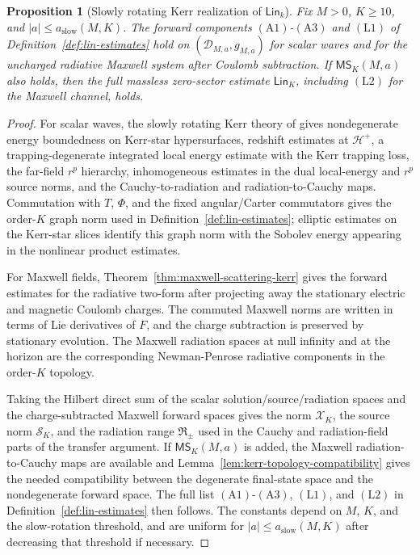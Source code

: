 \documentclass[11pt]{article}
\numberwithin{equation}{section}
\theoremstyle{plain}
\newtheorem{proposition}[theorem]{Proposition}
\theoremstyle{definition}
\theoremstyle{remark}
\newcommand{\Lin}{\mathsf{Lin}}
\newcommand{\MScat}{\mathsf{MS}}
\begin{document}
\begin{proposition}[Slowly rotating Kerr realization of \(\Lin_k\)]\label{prop:lin-estimates-kerr}
Fix \(M>0\), \(K\ge10\), and \(|a|\le a_{\mathrm{slow}}(M,K)\).  The forward components \(\mathrm{(A1)}\)-\(\mathrm{(A3)}\) and \(\mathrm{(L1)}\) of Definition~\ref{def:lin-estimates} hold on \((\mathcal D_{M,a},g_{M,a})\) for scalar waves and for the uncharged radiative Maxwell system after Coulomb subtraction.  If \(\MScat_K(M,a)\) also holds, then the full massless zero-sector estimate \(\Lin_K\), including \(\mathrm{(L2)}\) for the Maxwell channel, holds.
\end{proposition}

\begin{proof}
For scalar waves, the slowly rotating Kerr theory of \cite{DRSRKerr,DRSRKerrIII} gives nondegenerate energy boundedness on Kerr-star hypersurfaces, redshift estimates at \(\mathcal H^+\), a trapping-degenerate integrated local energy estimate with the Kerr trapping loss, the far-field \(r^p\) hierarchy, inhomogeneous estimates in the dual local-energy and \(r^p\) source norms, and the Cauchy-to-radiation and radiation-to-Cauchy maps.  Commutation with \(T\), \(\Phi\), and the fixed angular/Carter commutators gives the order-\(K\) graph norm used in Definition~\ref{def:lin-estimates}; elliptic estimates on the Kerr-star slices identify this graph norm with the Sobolev energy appearing in the nonlinear product estimates.

For Maxwell fields, Theorem~\ref{thm:maxwell-scattering-kerr} gives the forward estimates for the radiative two-form after projecting away the stationary electric and magnetic Coulomb charges.  The commuted Maxwell norms are written in terms of Lie derivatives of \(F\), and the charge subtraction is preserved by stationary evolution.  The Maxwell radiation spaces at null infinity and at the horizon are the corresponding Newman-Penrose radiative components in the order-\(K\) topology.

Taking the Hilbert direct sum of the scalar solution/source/radiation spaces and the charge-subtracted Maxwell forward spaces gives the norm \(\mathcal X_K\), the source norm \(\mathcal S_K\), and the radiation range \(\mathfrak R_\pm\) used in the Cauchy and radiation-field parts of the transfer argument.  If \(\MScat_K(M,a)\) is added, the Maxwell radiation-to-Cauchy maps are available and Lemma~\ref{lem:kerr-topology-compatibility} gives the needed compatibility between the degenerate final-state space and the nondegenerate forward space.  The full list \(\mathrm{(A1)}\)-\(\mathrm{(A3)}\), \(\mathrm{(L1)}\), and \(\mathrm{(L2)}\) in Definition~\ref{def:lin-estimates} then follows.  The constants depend on \(M\), \(K\), and the slow-rotation threshold, and are uniform for \(|a|\le a_{\mathrm{slow}}(M,K)\) after decreasing that threshold if necessary.
\end{proof}
\end{document}
